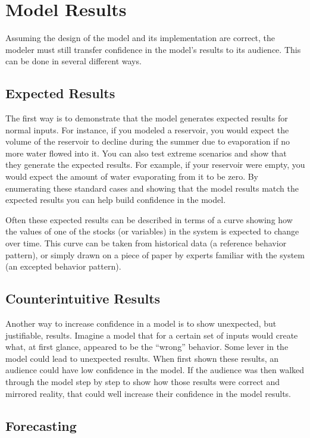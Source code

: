 \documentclass[]{memoir}
\begin{document}
\section{Model Results}

Assuming the design of the model and its implementation are correct, the
modeler must still transfer confidence in the model's results to its
audience. This can be done in several different ways.

\subsection{Expected Results}

The first way is to demonstrate that the model generates expected
results for normal inputs. For instance, if you modeled a reservoir, you
would expect the volume of the reservoir to decline during the summer
due to evaporation if no more water flowed into it. You can also test
extreme scenarios and show that they generate the expected results. For
example, if your reservoir were empty, you would expect the amount of
water evaporating from it to be zero. By enumerating these standard
cases and showing that the model results match the expected results you
can help build confidence in the model.

Often these expected results can be described in terms of a curve
showing how the values of one of the stocks (or variables) in the system
is expected to change over time. This curve can be taken from historical
data (a reference behavior pattern), or simply drawn on a piece of paper
by experts familiar with the system (an excepted behavior pattern).

\subsection{Counterintuitive Results}

Another way to increase confidence in a model is to show unexpected, but
justifiable, results. Imagine a model that for a certain set of inputs
would create what, at first glance, appeared to be the ``wrong''
behavior. Some lever in the model could lead to unexpected results. When
first shown these results, an audience could have low confidence in the
model. If the audience was then walked through the model step by step to
show how those results were correct and mirrored reality, that could
well increase their confidence in the model results.

\subsection{Forecasting}
\end{document}
